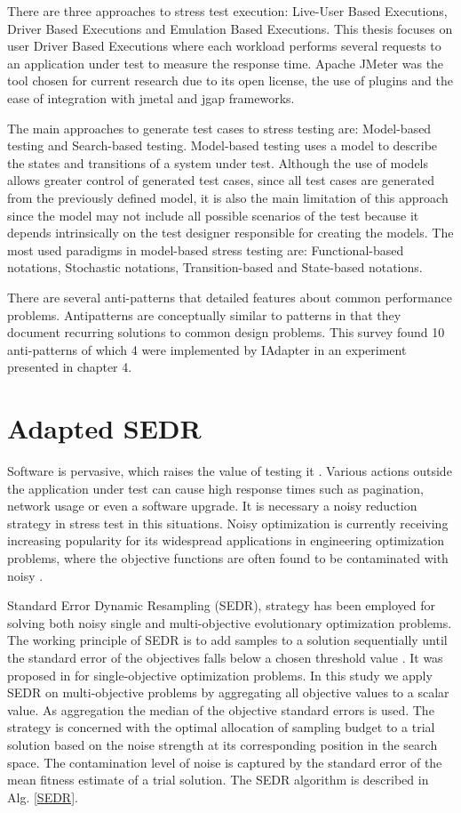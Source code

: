 \documentclass[espaco=umemeio,chapter=TITLE,twoside,openright]{abnt}
\begin{document}
There are three approaches to stress test execution: Live-User Based Executions, Driver Based Executions and Emulation Based Executions. This thesis focuses on user Driver Based Executions where each workload performs several requests to an application under test to measure the response time. Apache JMeter was the tool chosen for current research due to its open license, the use of plugins and the ease of integration with jmetal and jgap frameworks.

The main approaches to generate test cases to stress testing are: Model-based testing and Search-based testing. Model-based testing uses a model to describe the states and transitions of a system under test. Although the use of models allows greater control of generated test cases, since all test cases are generated from the previously defined model, it is also the main limitation of this approach since the model may not include all possible scenarios of the test because it depends intrinsically on the test designer responsible for creating the models. The most used paradigms in model-based stress testing are:  Functional-based notations, Stochastic notations, Transition-based and State-based notations. 

There are several anti-patterns that detailed features about common performance problems. Antipatterns
are conceptually similar to patterns in that they document recurring solutions to common design problems. This survey found 10 anti-patterns of which 4 were  implemented by IAdapter in an experiment presented in chapter 4.


\chapter{Adapted SEDR}


Software is pervasive, which raises the value of testing it \cite{Sandler2004}. Various actions outside the application under test can cause high response times such as pagination, network usage or even a software upgrade. It is necessary a noisy reduction strategy in stress test in this situations. Noisy optimization is currently receiving increasing popularity for its widespread applications in engineering optimization
problems, where the objective functions are often found to be contaminated with noisy \cite{Rakshit2017}. 


Standard Error Dynamic Resampling (SEDR), strategy has been employed for solving both noisy single and multi-objective evolutionary
optimization problems. The working principle of SEDR is to add samples to a solution sequentially until the standard error of
the objectives falls below a chosen threshold value \cite{Siegmund2013}. It was proposed in \cite{DiPietro2004} for single-objective optimization problems. In this study we apply SEDR on multi-objective problems by aggregating all objective values to a scalar value. As aggregation the median of the objective standard errors is used. The strategy is concerned with the optimal allocation of sampling budget to a trial solution based on the noise strength at its corresponding position in the search space. The contamination level of noise is captured by the standard error of the mean fitness estimate of a trial solution. The SEDR algorithm is described in Alg. \ref{SEDR}.
\end{document}
